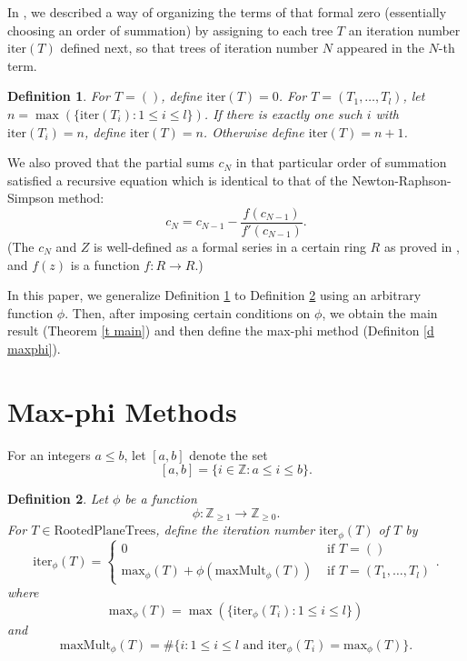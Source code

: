 \documentclass[11pt, oneside]{article}   	%
\newtheorem{definition}{Definition}
\newcommand{\iter}{\mathrm{iter}_\phi}
\newcommand{\maxphi}{\mathrm{max}_\phi}
\newcommand{\maxMult}{\mathrm{maxMult}_\phi}
\begin{document}
In \cite{DeFranco NRS}, we described a way of organizing the terms of that formal zero (essentially choosing an order of summation) by assigning to each tree $T$ an iteration number $\mathrm{iter}(T)$ defined next, so that trees of iteration number $N$ appeared in the $N$-th term. 

\begin{definition} \label{d iter}
For $T=()$, define $\mathrm{iter}(T) =0$. For $T = (T_1, \ldots, T_l)$, let $n = \max(\{ \mathrm{iter}(T_i) \colon 1 \leq i \leq l \})$. If there is exactly one such $i$ with $\mathrm{iter}(T_i)=n$, define $\mathrm{iter}(T) =n$. Otherwise define $\mathrm{iter}(T) =n+1$. 
\end{definition} 

We also proved that the partial sums $c_N$ in that particular order of summation satisfied a recursive equation which is identical to that of the Newton-Raphson-Simpson method: 
\[
c_N = c_{N-1} - \frac{f(c_{N-1})}{f'(c_{N-1})}.
\]
(The $c_N$ and $Z$ is well-defined as a formal series in a certain ring $R$ as proved in \cite{DeFranco NRS}, and $f(z)$ is a function $f \colon R \rightarrow R$.)
 
In this paper, we generalize Definition \ref{d iter} to Definition \ref{d iterphi} using an arbitrary function $\phi$. Then, after imposing certain conditions on $\phi$, we obtain the main result (Theorem \ref{t main}) and then define the max-phi method (Definiton \ref{d maxphi}). 
 
\section{Max-phi Methods}

For an integers $a\leq b$, let $[a,b]$ denote the set 
\[
[a,b]=\{ i \in \mathbb{Z} \colon a\leq i \leq b\}.
\]

\begin{definition} \label{d iterphi}
 Let $\phi$ be a function 
\[
\phi \colon \mathbb{Z}_{\geq 1} \rightarrow  \mathbb{Z}_{\geq 0}. 
\]
For $T \in \mathrm{RootedPlaneTrees}$, define the iteration number $\iter(T)$ of $T$ by  
\[
\iter(T) = \begin{cases} 0 &\text{ if } T=()\\ 
   \maxphi(T)+ \phi(\maxMult(T)) &\text{ if } T= (T_1, \ldots, T_l)
\end{cases}.
\]
where
\[
\maxphi(T) = \max(\{\iter(T_i) \colon 1 \leq i \leq l \})
\]
and 
\[
\maxMult(T) = \# \{i \colon  1 \leq i \leq l  \text{ and } \iter(T_i) = \maxphi(T)\}.
\]
\end{definition} 
\end{document}
